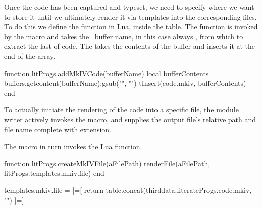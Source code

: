 \let\oldStopMkIVAltCode=\stopMkIVAltCode
\def\stopMkIVAltCode{%
  \oldStopMkIVAltCode%
  \directlua{thirddata.literateProgs.addMkIVCode('_typing_')}}

\stopMkIVCode

 Once the  code has been captured and typeset, we need to 
specify where we want to store it until we ultimately render it via 
templates into the corresponding  files. To do this we define 
the  function in Lua, inside the  table. 
The  function is invoked by the \type{\stopMkIVCode} 
macro and takes the \ConTeXt\ buffer name, in this case always 
, from which to extract the last  of 
 code. The  takes the contents of the buffer 
and inserts it at the end of the  array. 

\startLuaCode
function litProgs.addMkIVCode(bufferName)
  local bufferContents = buffers.getcontent(bufferName):gsub("", "\n")
  tInsert(code.mkiv, bufferContents)
end
\stopLuaCode

 
To actually initiate the rendering of the  code into a specific 
file, the module writer actively invokes the \type{\createMkIVFile} macro, 
and supplies the output file's relative path and file name complete with 
extension. 

\startMkIVCode


\def\createMkIVFile[#1]{
  \directlua{thirddata.literateProgs.createMkIVFile('#1')}
}

\stopMkIVCode

The \type{\createMkIVFile} macro in turn invokes the  
Lua function. 

\startLuaCode
function litProgs.createMkIVFile(aFilePath)
  renderFile(aFilePath, litProgs.templates.mkiv.file)
end
\stopLuaCode

\startLuaTemplate

templates.mkiv.file = [=[
{{ return table.concat(thirddata.literateProgs.code.mkiv, "\n\n") }}
]=]

\stopLuaTemplate

\stopchapter